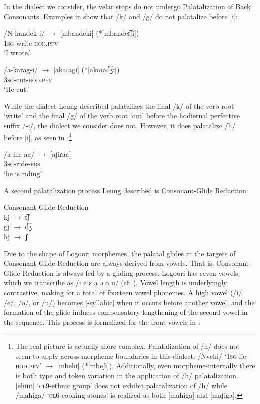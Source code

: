 \documentclass[output=paper]{langsci/langscibook}
\begin{document}
In the dialect we consider, the velar stops do not undergo Palatalization of Back Consonants. Examples in  show that /k/ and /g/ do not palatalize before [i]:


\ea\label{ex:glewwe:5}{}
   \ea{} 
 /N-handek-i/  $\rightarrow$  [mbandeki]  (*[mbandet͡ʃi])  \\{}
\textsc{1sg}-write-\textsc{hod.pfv}\\{}
\glt ‘I wrote.’ 

\ex{}
 /a-karag-i/  $\rightarrow$  \textsc{[}akaɾagi]  (*[akaɾad͡ʒi])\\{}
\textsc{3sg}-cut-\textsc{hod.pfv}\\{}
\glt ‘He cut.’\\{}
\z
\z 

While the dialect Leung described palatalizes the final /k/ of the verb root ‘write’ and the final /g/ of the verb root ‘cut’ before the hodiernal perfective suffix /-i/, the dialect we consider does not. However, it does palatalize /h/ before [i], as seen in :\footnote{The real picture is actually more complex. Palatalization of /h/ does not seem to apply across morpheme boundaries in this dialect: /Nvehi/ ‘1\textsc{sg}-lie-\textsc{hod.pfv}’ $\rightarrow$ [mbehi] (*[mbeʃi]). Additionally, even morpheme-internally there is both type and token variation in the application of /h/ palatalization. [ehiiɾi] ‘\textsc{cl}9-ethnic group’ does not exhibit palatalization of /h/ while /mahiga/ ‘\textsc{cl}6-cooking stones’ is realized as both [mahiga] and [maʃiga].} 

\ea\label{ex:glewwe:6}{}
 /a-hir-aa/  $\rightarrow$  [aʃiɾaa]\\{}
\textsc{3sg}-ride-\textsc{prs}\\{}
\glt ‘he is riding’
\z

A second palatalization process Leung described is Consonant-Glide Reduction:

\ea\label{ex:glewwe:7}{} 
 Consonant-Glide Reduction \citep[116]{Leung1991}\\{}
kj $\rightarrow$ t͡ʃ \\{}
gj $\rightarrow$ d͡ʒ \\{}
hj $\rightarrow$ ʃ \\{}
\z

Due to the shape of Logoori morphemes, the palatal glides in the targets of Consonant-Glide Reduction are always derived from vowels. That is, Consonant-Glide Reduction is always fed by a gliding process. Logoori has seven vowels, which we transcribe as /i e ɛ a ɔ o u/ (cf. \citealt{Leung1991}). Vowel length is underlyingly contrastive, making for a total of fourteen vowel phonemes. A high vowel (/i/, /e/, /o/, or /u/) becomes [-syllabic] when it occurs before another vowel, and the formation of the glide induces compensatory lengthening of the second vowel in the sequence. This process is formalized for the front vowels in :
\end{document}
